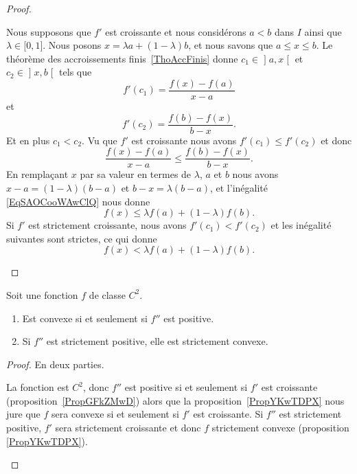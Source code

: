 \begin{proof}
\begin{subproof}
			Nous supposons que \( f'\) est croissante et nous considérons \( a<b\) dans \( I\) ainsi que \( \lambda\in \mathopen[ 0 , 1 \mathclose]\). Nous posons \( x=\lambda a+(1-\lambda)b\), et nous savons que \( a\leq x\leq b\). Le théorème des accroissements finis~\ref{ThoAccFinis} donne \( c_1\in\mathopen] a , x \mathclose[\) et \( c_2\in \mathopen] x , b \mathclose[\) tels que
		\begin{equation}
			f'(c_1)=\frac{ f(x)-f(a) }{ x-a }
		\end{equation}
		et
		\begin{equation}
			f'(c_2)=\frac{ f(b)-f(x) }{ b-x }.
		\end{equation}
		Et en plus \( c_1<c_2\). Vu que \( f'\) est croissante nous avons \( f'(c_1)\leq f'(c_2)\) et donc
		\begin{equation}       \label{EqSAOCooWAwClQ}
			\frac{ f(x)-f(a) }{ x-a }\leq\frac{ f(b)-f(x) }{ b-x }.
		\end{equation}
		En remplaçant \( x\) par sa valeur en termes de \( \lambda\), \( a\) et \( b\) nous avons \( x-a=(1-\lambda)(b-a)\) et \( b-x=\lambda(b-a)\), et l'inégalité \eqref{EqSAOCooWAwClQ} nous donne
		\begin{equation}
			f(x)\leq \lambda f(a)+(1-\lambda)f(b).
		\end{equation}
		Si \( f'\) est strictement croissante, nous avons \( f'(c_1)<f'(c_2)\) et les inégalité suivantes sont strictes, ce qui donne
		\begin{equation}
			f(x)< \lambda f(a)+(1-\lambda)f(b).
		\end{equation}
	\end{subproof}
\end{proof}

\begin{theorem} \label{ThoGXjKeYb}
	Soit une fonction \( f\) de classe \( C^2\).
	\begin{enumerate}
		\item       \label{ITEMooIUTQooTkRMoyBP}
		      Est convexe si et seulement si \( f''\) est positive.
		\item       \label{ITEMooXUOMooYIoOtv}
		      Si \( f''\) est strictement positive, elle est strictement convexe.
	\end{enumerate}
\end{theorem}

\begin{proof}
	En deux parties.
	\begin{subproof}
		La fonction est \( C^2\), donc \( f''\) est positive si et seulement si \( f'\) est croissante (proposition~\ref{PropGFkZMwD}) alors que la proposition~\ref{PropYKwTDPX} nous jure que \( f\) sera convexe si et seulement si \( f'\) est croissante.
		Si \( f''\) est strictement positive, \( f'\) sera strictement croissante et donc \( f\) strictement convexe (proposition \ref{PropYKwTDPX}).
	\end{subproof}
\end{proof}

